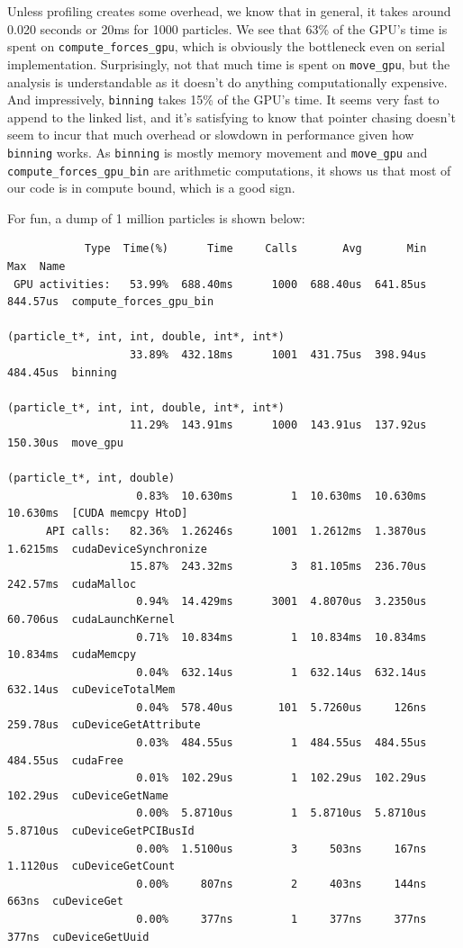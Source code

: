 \documentclass{article}
\begin{document}
Unless profiling creates some overhead, we know that in general, it takes around 0.020 seconds or 20ms for 1000 particles. We see that 63\% of the GPU's time is spent on \verb|compute_forces_gpu|, which is obviously the bottleneck even on serial implementation. Surprisingly, not that much time is spent on \verb|move_gpu|, but the analysis is understandable as it doesn't do anything computationally expensive. And impressively,
\verb|binning| takes 15\% of the GPU's time. It seems very fast to append to the linked list, and it's satisfying to know that pointer chasing doesn't seem to incur that much overhead or slowdown in performance given how \verb|binning| works. As \verb|binning| is mostly memory movement and \verb|move_gpu| and \verb|compute_forces_gpu_bin| are arithmetic computations, it shows us that most of our code is in compute bound, which is a good sign.

For fun, a dump of 1 million particles is shown below:

\begin{verbatim}
            Type  Time(%)      Time     Calls       Avg       Min       Max  Name
 GPU activities:   53.99%  688.40ms      1000  688.40us  641.85us  844.57us  compute_forces_gpu_bin
                                                            (particle_t*, int, int, double, int*, int*)
                   33.89%  432.18ms      1001  431.75us  398.94us  484.45us  binning
                                                            (particle_t*, int, int, double, int*, int*)
                   11.29%  143.91ms      1000  143.91us  137.92us  150.30us  move_gpu
                                                            (particle_t*, int, double)
                    0.83%  10.630ms         1  10.630ms  10.630ms  10.630ms  [CUDA memcpy HtoD]
      API calls:   82.36%  1.26246s      1001  1.2612ms  1.3870us  1.6215ms  cudaDeviceSynchronize
                   15.87%  243.32ms         3  81.105ms  236.70us  242.57ms  cudaMalloc
                    0.94%  14.429ms      3001  4.8070us  3.2350us  60.706us  cudaLaunchKernel
                    0.71%  10.834ms         1  10.834ms  10.834ms  10.834ms  cudaMemcpy
                    0.04%  632.14us         1  632.14us  632.14us  632.14us  cuDeviceTotalMem
                    0.04%  578.40us       101  5.7260us     126ns  259.78us  cuDeviceGetAttribute
                    0.03%  484.55us         1  484.55us  484.55us  484.55us  cudaFree
                    0.01%  102.29us         1  102.29us  102.29us  102.29us  cuDeviceGetName
                    0.00%  5.8710us         1  5.8710us  5.8710us  5.8710us  cuDeviceGetPCIBusId
                    0.00%  1.5100us         3     503ns     167ns  1.1120us  cuDeviceGetCount
                    0.00%     807ns         2     403ns     144ns     663ns  cuDeviceGet
                    0.00%     377ns         1     377ns     377ns     377ns  cuDeviceGetUuid
\end{verbatim}
\end{document}
